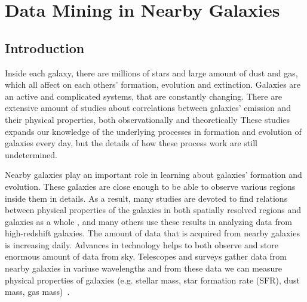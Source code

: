 \chapter{Data Mining in Nearby Galaxies}
\label{ch: paper3}
\section{Introduction} %
Inside each galaxy, there are millions of stars and large amount of dust and gas, which all affect on each others' formation, evolution and extinction.
Galaxies are an active and complicated systems, that are constantly changing.
There are extensive amount of studies about correlations between galaxies' emission and their physical properties, both observationally and theoretically %
These studies expands our knowledge of the underlying processes in formation and evolution of galaxies every day, but the details of how these process work are still undetermined.

Nearby galaxies play an important role in learning about galaxies' formation and evolution.
These galaxies are close enough to be able to observe various regions inside them in details.
As a result, many studies are devoted to find relations between physical properties of the galaxies in both spatially resolved regions and galaxies as a whole%
, and many others use these results in analyzing data from high-redshift galaxies. %
The amount of data that is acquired from nearby galaxies is increasing daily.
Advances in technology helps to both observe and store enormous amount of data from sky.%
Telescopes and surveys gather data from nearby galaxies in variuse wavelengths and from these data we can measure physical properties of galaxies (e.g. stellar mass, star formation rate (SFR), dust mass, gas mass)~\citep[e.g.][]{Calzetti07,Dale09,Eskew12}.

